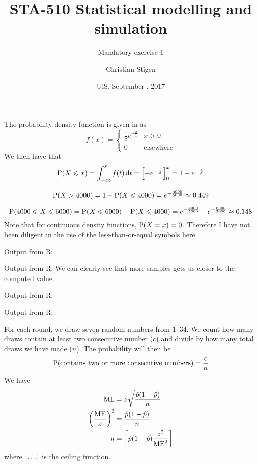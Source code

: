 \documentclass[a4paper,english,12pt]{article}
\title{STA-510 Statistical modelling and simulation}
\subtitle{Mandatory exercise 1}
\author{Christian Stigen}
\date{UiS, September \nth{21}, 2017}
\begin{document}
\maketitle

The probability density function is given in \cite{walpole} as
\[
  f(x) =
    \begin{cases}
      \displaystyle
        \frac{1}{\beta} e^{-\frac{x}{\beta}} & x > 0  \\
        0 & \text{elsewhere}
    \end{cases}
\]
We then have that
\[
  \Prb(X \leqslant x) = \int_{-\infty}^{x} f(t)\, \mathrm{d}t 
    = \left[ -e^{-\frac{t}{\beta}} \right]_{0}^{x} = 1 - e^{-\frac{x}{\beta}}
\]

\[
  \Prb(X > 4000) = 1 - \Prb(X \leqslant 4000) = e^{-\frac{4000}{5000}} \approx 0.449
\]

\[
  \Prb(4000 \leqslant X \leqslant 6000) =
    \Prb(X \leqslant 6000) - \Prb(X \leqslant 4000) =
       e^{-\frac{4000}{5000}} - e^{-\frac{6000}{5000}}
       \approx 0.148
\]
Note that for continuous density functions, $\Prb(X=x) = 0$. Therefore I have not
been diligent in the use of the less-than-or-equal symbols here.

Output from R:

Output from R:
We can clearly see that more samples gets us closer to the computed value.

Output from R:

Output from R:

For each round, we draw seven random numbers from 1--34. We count how many
draws contain at least two consecutive number ($c$) and divide by how many
total draws we have made ($n$). The probability will then be
\[
  \Prb(\text{contains two or more consecutive numbers}) = \frac{c}{n}
\]
We have
\begin{align*}
  \text{ME} &= z\sqrt{\frac{\hat{p}(1-\hat{p})}{n}} \\
  \left(\frac{\text{ME}}{z}\right)^2 &= \frac{\hat{p}(1-\hat{p})}{n} \\
  n &= \ceil*{ \hat{p}(1-\hat{p}) \frac{z^2}{\text{ME}^2} }
\end{align*}
where $\ceil{\dots}$ is the ceiling function.
\end{document}
